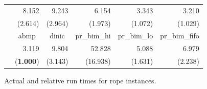 \documentclass{article}
\begin{document}
\begin{figure}[ht]
\begin{center}
\begin{scriptsize}
\begin{tabular}{||c|r|r|r|r|r||}
    &   8.152   &   9.243   &   6.154   &   3.343   &   3.210   \\
    &   (2.614) &   (2.964) &   (1.973) &   (1.072) &   (1.029) \\  \cline{2-6}
    &   \multicolumn{1}{|c|}{{\sf abmp}}    &   \multicolumn{1}{|c|}{{\sf dinic}}   &   \multicolumn{1}{|c|}{{\sf pr\_bim\_hi}} &   \multicolumn{1}{|c|}{{\sf pr\_bim\_lo}} &   \multicolumn{1}{|c||}{{\sf pr\_bim\_fifo}}  \\  \cline{2-6}
    &   3.119   &   9.804   &   52.828  &   5.088   &   6.979   \\
    &   ({\bf 1.000})   &   (3.143) &   (16.938)    &   (1.631) &   (2.238) \\  \hline
\hline
\end{tabular}
\end{scriptsize}
\caption{\label{Figure:ropescaling}Actual and relative run times for {\sf rope} instances.}
\end{center}
\end{figure}
\end{document}
